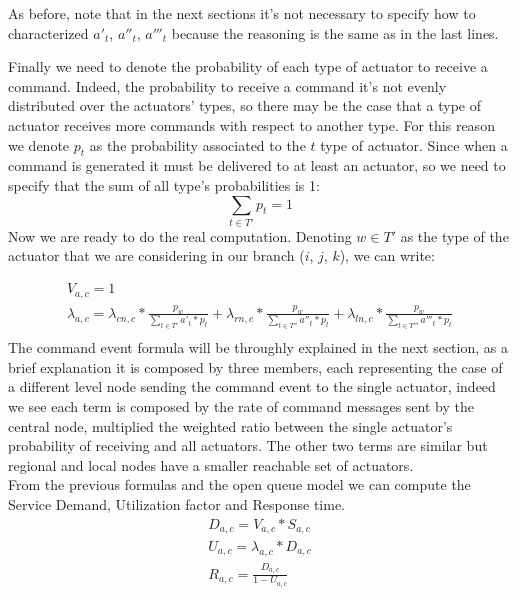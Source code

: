 \documentclass[11pt]{article}
\begin{document}
As before, note that in the next sections it's not necessary to specify how to characterized $a'_{t}$, $a''_{t}$, $a'''_{t}$ because the reasoning is the same as in the last lines.


Finally we need to denote the probability of each type of actuator to receive a command. Indeed, the probability to receive a command it's not evenly distributed over the actuators' types, so there may be the case that a type of actuator receives more commands with respect to another type.
For this reason we denote $p_t$ as the probability associated to the $t$ type of actuator.
Since when a command is generated it must be delivered to at least an actuator, so we need to specify that the sum of all type's probabilities is 1:
\begin{equation}
    \sum_{t \in T'}{p_t} = 1
\end{equation}
Now we are ready to do the real computation. Denoting $w \in T'$ as the type of the actuator that we are considering in our branch ($i$, $j$, $k$), we can write:

\begin{equation}
	\begin{array}{l}
		V_{a,c} = 1 \\

		\lambda_{a, c} = \lambda_{cn, c} * \frac{p_{w}}{\sum\limits_{t \in T'}{a'_{t} * p_{t}}} + \lambda_{rn, c} *\frac{p_{w}}{\sum\limits_{t \in T''}{a''_{t} * p_{t}}} + \lambda_{ln, c} * \frac{p_{w}}{\sum\limits_{t \in T'''}{a'''_{t} * p_{t}}}   \\
	\end{array}
\end{equation}
The command event formula will be throughly explained in the next section, as a brief explanation it is composed by three members, each representing the case of a different level node sending the command event to the single actuator, indeed we see each term is composed by the rate of command messages sent by the central node, multiplied the weighted ratio between the single actuator's probability of receiving and all actuators. The other two terms are similar but regional and local nodes have a smaller reachable set of actuators.\\
From the previous formulas and the open queue model we can compute the Service Demand, Utilization factor and Response time.
\begin{equation}
	\begin{array}{l}
		D_{a, c} = V_{a, c} * S_{a, c} \\
		U_{a, c} = \lambda_{a, c} * D_{a, c} \\
		R_{a, c} = \frac{D_{a, c}}{1 - U_{a,c}} \\
	\end{array}
\end{equation}
\end{document}
